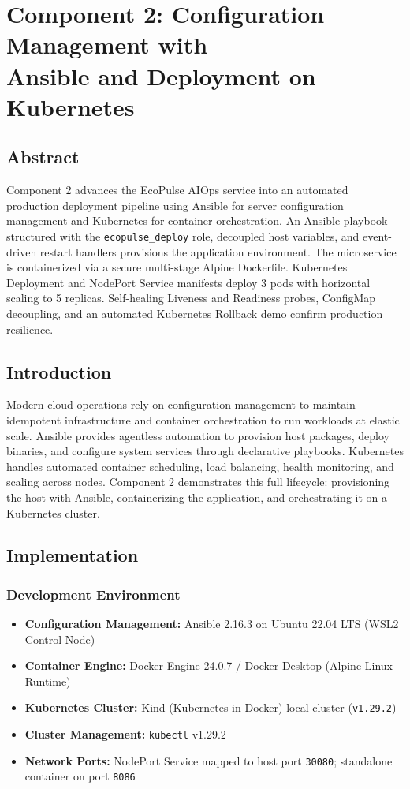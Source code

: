 \documentclass[12pt,a4paper]{article}
\begin{document}
\section*{Component 2: Configuration Management with \\ Ansible and Deployment on Kubernetes}

\subsection*{Abstract}
Component 2 advances the EcoPulse AIOps service into an automated production deployment pipeline using Ansible for server configuration management and Kubernetes for container orchestration. An Ansible playbook structured with the \texttt{ecopulse\_deploy} role, decoupled host variables, and event-driven restart handlers provisions the application environment. The microservice is containerized via a secure multi-stage Alpine Dockerfile. Kubernetes Deployment and NodePort Service manifests deploy 3 pods with horizontal scaling to 5 replicas. Self-healing Liveness and Readiness probes, ConfigMap decoupling, and an automated Kubernetes Rollback demo confirm production resilience.

\subsection*{Introduction}
Modern cloud operations rely on configuration management to maintain idempotent infrastructure and container orchestration to run workloads at elastic scale. Ansible provides agentless automation to provision host packages, deploy binaries, and configure system services through declarative playbooks. Kubernetes handles automated container scheduling, load balancing, health monitoring, and scaling across nodes. Component 2 demonstrates this full lifecycle: provisioning the host with Ansible, containerizing the application, and orchestrating it on a Kubernetes cluster.

\subsection*{Implementation}

\subsubsection*{Development Environment}
\begin{itemize}[nosep]
    \item \textbf{Configuration Management:} Ansible 2.16.3 on Ubuntu 22.04 LTS (WSL2 Control Node)
    \item \textbf{Container Engine:} Docker Engine 24.0.7 / Docker Desktop (Alpine Linux Runtime)
    \item \textbf{Kubernetes Cluster:} Kind (Kubernetes-in-Docker) local cluster (\texttt{v1.29.2})
    \item \textbf{Cluster Management:} \texttt{kubectl} v1.29.2
    \item \textbf{Network Ports:} NodePort Service mapped to host port \texttt{30080}; standalone container on port \texttt{8086}
\end{itemize}
\end{document}
